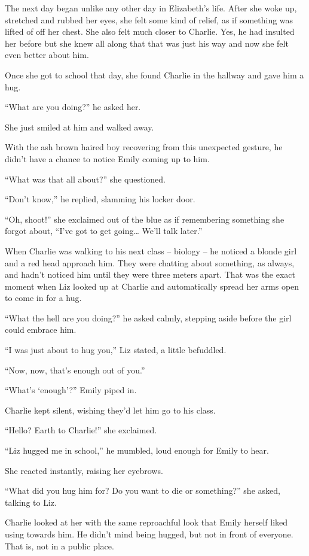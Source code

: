 The next day began unlike any other day in Elizabeth's life. After she woke up,  stretched and rubbed her eyes, she felt some kind of relief, as if something was lifted of off her chest. She also felt much closer to Charlie. Yes, he had insulted her before but she knew all along that that was just his way and now she felt even better about him.

Once she got to school that day, she found Charlie in the hallway and gave him a hug.

“What are you doing?” he asked her.

She just smiled at him and walked away.

With the ash brown haired boy recovering from this unexpected gesture, he didn't have a chance to notice Emily coming up to him.

“What was that all about?” she questioned.

“Don't know,” he replied, slamming his locker door.

“Oh, shoot!” she exclaimed out of the blue as if remembering something she forgot about, “I've got to get going… We'll talk later.”

\bigskip

When Charlie was walking to his next class – biology – he noticed a blonde girl and a red head approach him. They were chatting about something, as always, and hadn't noticed him until they were three meters apart. That was the exact moment when Liz looked up at Charlie and automatically spread her arms open to come in for a hug.

“What the hell are you doing?” he asked calmly, stepping aside before the girl could embrace him.

“I was just about to hug you,” Liz stated, a little befuddled.

“Now, now, that's enough out of you.”

“What's ‘enough'?” Emily piped in.

Charlie kept silent, wishing they'd let him go to his class.

“Hello? Earth to Charlie!” she exclaimed.

“Liz hugged me in school,” he mumbled, loud enough for Emily to hear.

She reacted instantly, raising her eyebrows.

“What did you hug him for? Do you want to die or something?” she asked, talking to Liz.

Charlie looked at her with the same reproachful look that Emily herself liked using towards him. He didn't mind being hugged, but not in front of everyone. That is, not in a public place.

